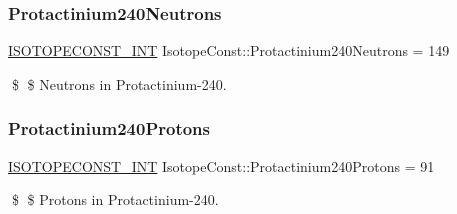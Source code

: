 \subsubsection{\texorpdfstring{Protactinium240\+Neutrons}{Protactinium240Neutrons}}
{\footnotesize\ttfamily \mbox{\hyperlink{group___isotope_const-_macros_ga5f18360b3e99483a35c32d789e62621c}{I\+S\+O\+T\+O\+P\+E\+C\+O\+N\+S\+T\+\_\+\+I\+NT}} Isotope\+Const\+::\+Protactinium240\+Neutrons = 149}

\$ \$ Neutrons in Protactinium-\/240. \mbox{\label{group___isotope_const-_protactinium-_pa240_ga22e9336f554313c7ed035d98433c2dc8}} 
\subsubsection{\texorpdfstring{Protactinium240\+Protons}{Protactinium240Protons}}
{\footnotesize\ttfamily \mbox{\hyperlink{group___isotope_const-_macros_ga5f18360b3e99483a35c32d789e62621c}{I\+S\+O\+T\+O\+P\+E\+C\+O\+N\+S\+T\+\_\+\+I\+NT}} Isotope\+Const\+::\+Protactinium240\+Protons = 91}

\$ \$ Protons in Protactinium-\/240. 
